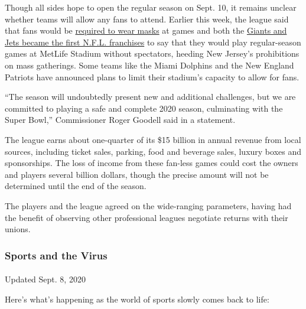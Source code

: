 Though all sides hope to open the regular season on Sept. 10, it remains
unclear whether teams will allow any fans to attend. Earlier this week,
the league said that fans would be
\href{https://twitter.com/NFLprguy/status/1285995479596228615}{required
to wear masks} at games and both the
\href{https://www.nytimes3xbfgragh.onion/2020/07/20/sports/football/jets-giants-rutgers-fans-metlife-stadium.html}{Giants
and Jets became the first N.F.L. franchises} to say that they would play
regular-season games at MetLife Stadium without spectators, heeding New
Jersey's prohibitions on mass gatherings. Some teams like the Miami
Dolphins and the New England Patriots have announced plans to limit
their stadium's capacity to allow for fans.

``The season will undoubtedly present new and additional challenges, but
we are committed to playing a safe and complete 2020 season, culminating
with the Super Bowl,'' Commissioner Roger Goodell said in a statement.

The league earns about one-quarter of its \$15 billion in annual revenue
from local sources, including ticket sales, parking, food and beverage
sales, luxury boxes and sponsorships. The loss of income from these
fan-less games could cost the owners and players several billion
dollars, though the precise amount will not be determined until the end
of the season.

The players and the league agreed on the wide-ranging parameters, having
had the benefit of observing other professional leagues negotiate
returns with their unions.

\hypertarget{sports-and-the-virus}{%
\subsubsection{Sports and the Virus}\label{sports-and-the-virus}}

\paragraph{}

Updated Sept. 8, 2020

Here's what's happening as the world of sports slowly comes back to
life:

